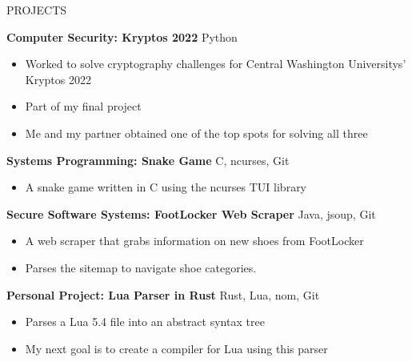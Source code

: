 \documentclass{resume}
\begin{document}
\begin{rSection}{PROJECTS}
	\vspace{-1.25em}

	\item \textbf{Computer Security: Kryptos 2022} \hfill {Python}\\
	\vspace{-1.25em}
	\begin{itemize}
		\setlength{\itemsep}{-3pt}
		\item Worked to solve cryptography challenges for Central Washington Universitys' Kryptos 2022
		\item Part of my final project
		\item Me and my partner obtained one of the top spots for solving all three
	\end{itemize}

	\item \textbf{Systems Programming: Snake Game} \hfill {C, ncurses, Git}\\
	\vspace{-1.25em}
	\begin{itemize}
		\setlength{\itemsep}{-3pt}
		\item A snake game written in C using the ncurses TUI library
	\end{itemize}

\item \textbf{Secure Software Systems: FootLocker Web Scraper} \hfill {Java, jsoup, Git}\\
	\vspace{-1.25em}
	\begin{itemize}
		\setlength{\itemsep}{-3pt}
		\item A web scraper that grabs information on new shoes from FootLocker
		\item Parses the sitemap to navigate shoe categories.
	\end{itemize}

	\item \textbf{Personal Project: Lua Parser in Rust} \hfill {Rust, Lua, nom, Git}\\
	\vspace{-1.25em}
	\begin{itemize}
		\setlength{\itemsep}{-3pt}
		\item Parses a Lua 5.4 file into an abstract syntax tree
		\item My next goal is to create a compiler for Lua using this parser
	\end{itemize}
\end{rSection}

\end{document}
